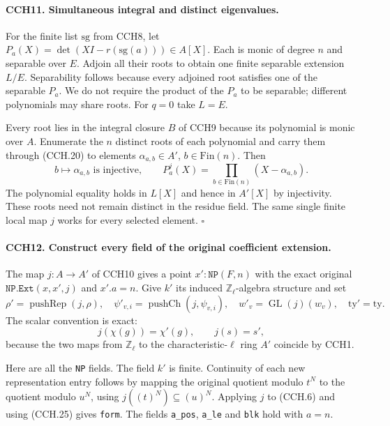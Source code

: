 \paragraph{CCH11. Simultaneous integral and distinct eigenvalues.}
\label{claim:CCH11}
For the finite list $\mathrm{sg}$ from CCH8, let
$P_a(X)=\det(XI-r(\mathrm{sg}(a)))\in A[X]$.
Each is monic of degree $n$ and separable over $E$.
Adjoin all their roots to obtain one finite separable
extension $L/E$.  Separability follows because every adjoined
root satisfies one of the separable $P_a$.
We do not require the product of the $P_a$ to be separable;
different polynomials may share roots.
For $q=0$ take $L=E$.

Every root lies in the integral closure $B$ of CCH9 because
its polynomial is monic over $A$.  Enumerate the $n$ distinct
roots of each polynomial and carry them through (CCH.20)
to elements $\alpha_{a,b}\in A'$, $b\in\mathrm{Fin}(n)$.
Then
\[
 b\longmapsto\alpha_{a,b}\text{ is injective},\qquad
             P_a^j(X)=\prod_{b\in\mathrm{Fin}(n)}(X-\alpha_{a,b}).
 \tag{CCH.23}
\]
The polynomial equality holds in $L[X]$ and hence in $A'[X]$
by injectivity.  These roots need not remain distinct in the
residue field.  The same single finite local map $j$ works
for every selected element.
\hfill$\square$

\paragraph{CCH12. Construct every field of the original coefficient extension.}
\label{claim:CCH12}
The map $j:A\to A'$ of CCH10 gives a point
$x':\texttt{NP}(F,n)$ with the exact original
$\texttt{NP.Ext}(x,x',j)$ and $x'.a=n$.
Give $k'$ its induced $\mathbb Z_\ell$-algebra structure and set
\[
 \rho'=\operatorname{pushRep}(j,\rho),\quad
 \psi'_{v,i}=\operatorname{pushCh}(j,\psi_{v,i}),\quad
 w'_v=\operatorname{GL}(j)(w_v),\quad \mathrm{ty}'=\mathrm{ty}.
 \tag{CCH.24}
\]
The scalar convention is exact:
\[
                 j(\chi(g))=\chi'(g),\qquad j(s)=s',
 \tag{CCH.25}
\]
because the two maps from $\mathbb Z_\ell$ to the
characteristic-$\ell$ ring $A'$ coincide by CCH1.

Here are all the \texttt{NP} fields.  The field $k'$ is finite.
Continuity of each new representation entry follows by
mapping the original quotient modulo $t^N$ to the quotient
modulo $u^N$, using $j((t)^N)\subseteq(u)^N$.
Applying $j$ to (CCH.6) and using (CCH.25) gives \texttt{form}.
The fields \texttt{a\_pos}, \texttt{a\_le} and \texttt{blk}
hold with $a=n$.

